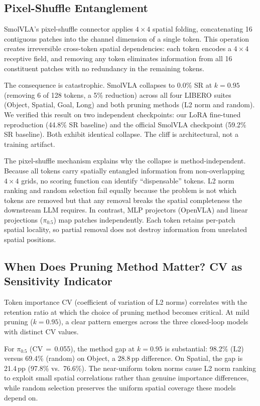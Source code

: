 \subsection{Pixel-Shuffle Entanglement}
\label{sec:pixel_shuffle}

SmolVLA's pixel-shuffle connector applies $4{\times}4$ spatial folding, concatenating 16 contiguous patches into the channel dimension of a single token. This operation creates irreversible cross-token spatial dependencies: each token encodes a $4{\times}4$ receptive field, and removing any token eliminates information from all 16 constituent patches with no redundancy in the remaining tokens.

The consequence is catastrophic. SmolVLA collapses to 0.0\% SR at $k{=}0.95$ (removing 6 of 128 tokens, a 5\% reduction) across all four LIBERO suites (Object, Spatial, Goal, Long) and both pruning methods (L2 norm and random). We verified this result on two independent checkpoints: our LoRA fine-tuned reproduction (44.8\% SR baseline) and the official SmolVLA checkpoint (59.2\% SR baseline). Both exhibit identical collapse. The cliff is architectural, not a training artifact.

The pixel-shuffle mechanism explains why the collapse is method-independent. Because all tokens carry spatially entangled information from non-overlapping $4{\times}4$ grids, no scoring function can identify ``dispensable'' tokens. L2 norm ranking and random selection fail equally because the problem is not which tokens are removed but that any removal breaks the spatial completeness the downstream LLM requires. In contrast, MLP projectors (OpenVLA) and linear projections ($\pi_0.5$) map patches independently. Each token retains per-patch spatial locality, so partial removal does not destroy information from unrelated spatial positions.

\subsection{When Does Pruning Method Matter? CV as Sensitivity Indicator}
\label{sec:cv_sensitivity}

Token importance CV (coefficient of variation of L2 norms) correlates with the retention ratio at which the choice of pruning method becomes critical. At mild pruning ($k{=}0.95$), a clear pattern emerges across the three closed-loop models with distinct CV values.

For $\pi_0.5$ (CV$\,{=}\,$0.055), the method gap at $k{=}0.95$ is substantial: 98.2\% (L2) versus 69.4\% (random) on Object, a 28.8\,pp difference. On Spatial, the gap is 21.4\,pp (97.8\% vs.\ 76.6\%). The near-uniform token norms cause L2 norm ranking to exploit small spatial correlations rather than genuine importance differences, while random selection preserves the uniform spatial coverage these models depend on.

